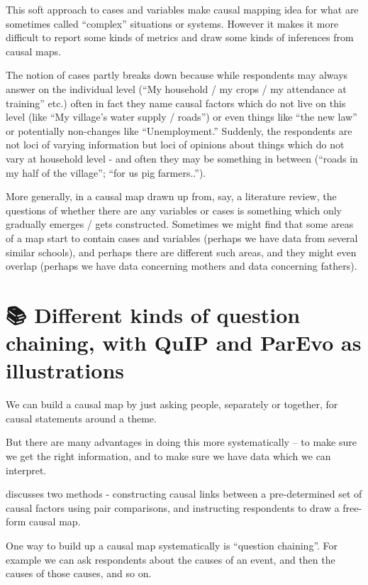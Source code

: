 \documentclass[
]{book}
\begin{document}
This soft approach to cases and variables make causal mapping idea for what are sometimes called ``complex'' situations or systems. However it makes it more difficult to report some kinds of metrics and draw some kinds of inferences from causal maps.

The notion of cases partly breaks down because while respondents may always answer on the individual level (``My household / my crops / my attendance at training'' etc.) often in fact they name causal factors which do not live on this level (like ``My village's water supply / roads'') or even things like ``the new law'' or potentially non-changes like ``Unemployment.'' Suddenly, the respondents are not loci of varying information but loci of opinions about things which do not vary at household level - and often they may be something in between (``roads in my half of the village''; ``for us pig farmers..'').

More generally, in a causal map drawn up from, say, a literature review, the questions of whether there are any variables or cases is something which only gradually emerges / gets constructed. Sometimes we might find that some areas of a map start to contain cases and variables (perhaps we have data from several similar schools), and perhaps there are different such areas, and they might even overlap (perhaps we have data concerning mothers and data concerning fathers).

\hypertarget{different-kinds-of-question-chaining-with-quip-and-parevo-as-illustrations}{%
\chapter{📚 Different kinds of question chaining, with QuIP and ParEvo as illustrations}\label{different-kinds-of-question-chaining-with-quip-and-parevo-as-illustrations}}

We can build a causal map by just asking people, separately or together, for causal statements around a theme.

But there are many advantages in doing this more systematically -- to make sure we get the right information, and to make sure we have data which we can interpret.

discusses two methods - constructing causal links between a pre-determined set of causal factors using pair comparisons, and instructing respondents to draw a free-form causal map.

One way to build up a causal map systematically is ``question chaining''. For example we can ask respondents about the causes of an event, and then the causes of those causes, and so on.
\end{document}
